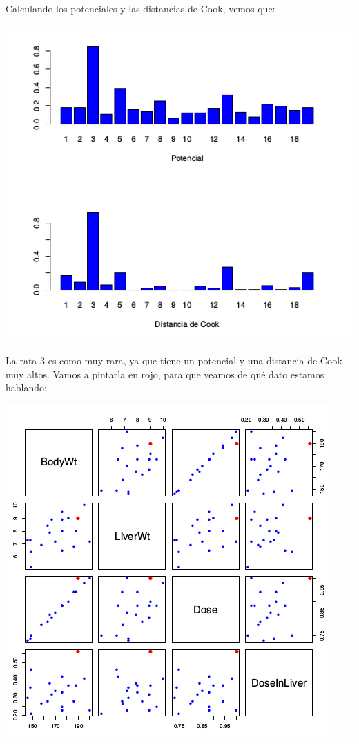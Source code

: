 Calculando los potenciales y las distancias de Cook, vemos que:
\begin{center}
\includegraphics[scale=0.75]{img/CookVsPotencial.png}
\end{center}

La rata 3 es como muy rara, ya que tiene un potencial y una distancia de Cook muy altos. Vamos a pintarla en rojo, para que veamos de qué dato estamos hablando:

\begin{center}
\includegraphics[scale=0.6]{img/DiagramaRatasRojo.png}
\end{center}


